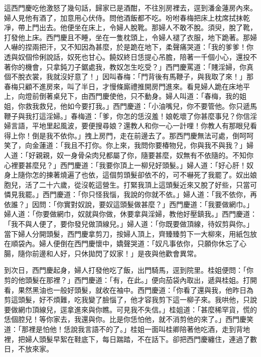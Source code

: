 這西門慶吃他激怒了幾句話，歸家已是酒酣，不往別房裡去，逕到潘金蓮房內來。婦人見他有酒了，加意用心伏侍。問他酒飯都不吃。吩咐春梅把床上枕席拭抹乾凈，帶上門出去。他便坐在床上，令婦人脫靴。那婦人不敢不脫。須臾，脫了靴，打發他上床。西門慶且不睡，坐在一隻枕頭上，令婦人褪了衣服，地下跪著。那婦人嚇的捏兩把汗，又不知因為甚麼，於是跪在地下，柔聲痛哭道：「我的爹爹！你透與奴個伶俐說話，奴死也甘心。饒奴終日恁提心吊膽，陪著一千個小心，還投不著你的機會，只拿鈍刀子鋸處我，教奴怎生吃受？」西門慶罵道：「賤淫婦，你真個不脫衣裳，我就沒好意了！」因叫春梅：「門背後有馬鞭子，與我取了來！」那春梅只顧不進房來，叫了半日，才慢條廝禮推開房門進來。看見婦人跪在床地平上，向燈前倒著桌兒下，由西門慶使他，只不動身。婦人叫道：「春梅，我的姐姐，你救我救兒，他如今要打我。」西門慶道：「小油嘴兒，你不要管他。你只遞馬鞭子與我打這淫婦。」春梅道：「爹，你怎的恁沒羞！娘乾壞了你甚麼事兒？你信淫婦言語，平地里起風波，要便搜尋娘？還教人和你一心一計哩！你教人有那眼兒看得上你！倒是我不依你。」拽上房門，走在前邊去了。那西門慶無法可處，倒呵呵笑了，向金蓮道：「我且不打你。你上來，我問你要椿物兒，你與我不與我？」婦人道：「好親親，奴一身骨朵肉兒都屬了你，隨要甚麼，奴無有不依隨的。不知你心裡要甚麼兒？」西門慶道：「我要你頂上一柳兒好頭髮。」婦人道：「好心肝！奴身上隨你怎的揀著燒遍了也依，這個剪頭髮卻依不的，可不嚇死了我罷了。奴出娘胞兒，活了二十六歲，從沒乾這營生。打緊我頂上這頭髮近來又脫了好些，只當可憐見我罷。」西門慶道：「你只怪我惱，我說的你就不依。」婦人道：「我不依你，再依誰？」因問：「你實對奴說，要奴這頭髮做甚麼？」西門慶道：「我要做網巾。」婦人道：「你要做網巾，奴就與你做，休要拿與淫婦，教他好壓鎮我。」西門慶道：「我不與人便了，要你發兒做頂線兒。」婦人道：「你既要做頂線，待奴剪與你。」當下婦人分開頭髮，西門慶拿剪刀，按婦人頂上，齊臻臻剪下一大柳來，用紙包放在順袋內。婦人便倒在西門慶懷中，嬌聲哭道：「奴凡事依你，只願你休忘了心腸，隨你前邊和人好，只休拋閃了奴家！」是夜與他歡會異常。

到次日，西門慶起身，婦人打發他吃了飯，出門騎馬，逕到院里。桂姐便問：「你剪的他頭髮在那裡？」西門慶道：「有，在此。」便向茄袋內取出，遞與桂姐。打開看，果然黑油也一般好頭髮，就收在袖中。西門慶道：「你看了還與我，他昨日為剪這頭髮，好不煩難，吃我變了臉惱了，他才容我剪下這一柳子來。我哄他，只說要做網巾頂線兒，逕拿進來與你瞧。可見我不失信。」桂姐道：「甚麼稀罕貨，慌的恁個腔兒！等你家去，我還與你。比是你恁怕他，就不消剪他的來了。」西門慶笑道：「那裡是怕他！恁說我言語不的了。」桂姐一面叫桂卿陪著他吃酒，走到背地裡，把婦人頭髮早絮在鞋底下，每日踹踏，不在話下。卻把西門慶纏住，連過了數日，不放來家。

